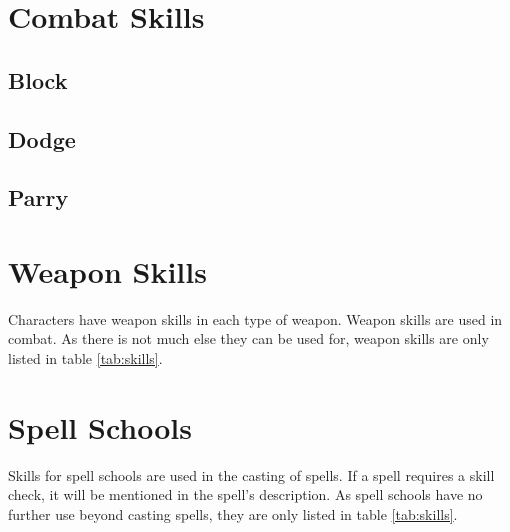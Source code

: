 \begin{multicols*}{2}
    \section{Combat Skills}

    \subsection*{Block}\label{skill:block}

    \subsection*{Dodge}\label{skill:dodge}

    \subsection*{Parry}\label{skill:parry}

    \section{Weapon Skills}\label{weapon-skills}
    Characters have weapon skills in each type of weapon. Weapon skills are used in
    combat. As there is not much else they can be used for, weapon skills are only
    listed in table \ref{tab:skills}.


    \section{Spell Schools}\label{spell-schools}
    Skills for spell schools are used in the casting of spells. If a spell requires
    a skill check, it will be mentioned in the spell's description. As spell
    schools have no further use beyond casting spells, they are only listed in
    table \ref{tab:skills}.
\end{multicols*}

